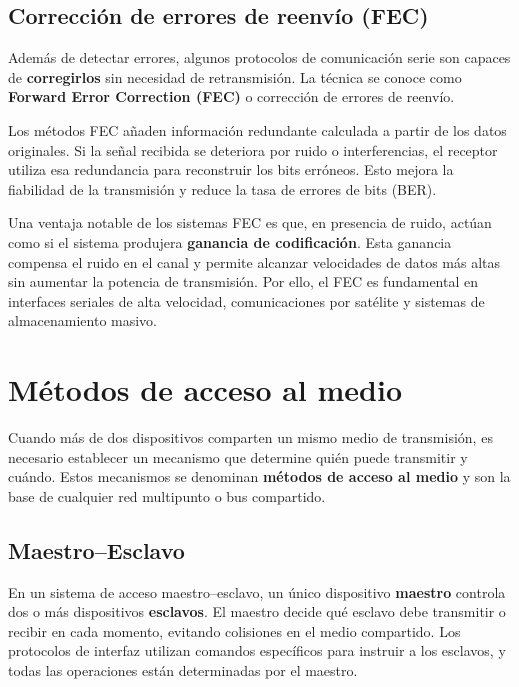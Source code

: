 \subsection{Corrección de errores de reenvío (FEC)}

Además de detectar errores, algunos protocolos de comunicación serie son capaces de \textbf{corregirlos} sin necesidad de retransmisión. La técnica se conoce como \textbf{Forward Error Correction (FEC)} o corrección de errores de reenvío.

Los métodos FEC añaden información redundante calculada a partir de los datos originales. Si la señal recibida se deteriora por ruido o interferencias, el receptor utiliza esa redundancia para reconstruir los bits erróneos. Esto mejora la fiabilidad de la transmisión y reduce la tasa de errores de bits (BER).

Una ventaja notable de los sistemas FEC es que, en presencia de ruido, actúan como si el sistema produjera \textbf{ganancia de codificación}. Esta ganancia compensa el ruido en el canal y permite alcanzar velocidades de datos más altas sin aumentar la potencia de transmisión. Por ello, el FEC es fundamental en interfaces seriales de alta velocidad, comunicaciones por satélite y sistemas de almacenamiento masivo.




\section{Métodos de acceso al medio}

Cuando más de dos dispositivos comparten un mismo medio de transmisión, es necesario establecer un mecanismo que determine quién puede transmitir y cuándo. Estos mecanismos se denominan \textbf{métodos de acceso al medio} y son la base de cualquier red multipunto o bus compartido.

\subsection{Maestro--Esclavo}

En un sistema de acceso maestro--esclavo, un único dispositivo \textbf{maestro} controla dos o más dispositivos \textbf{esclavos}. El maestro decide qué esclavo debe transmitir o recibir en cada momento, evitando colisiones en el medio compartido. Los protocolos de interfaz utilizan comandos específicos para instruir a los esclavos, y todas las operaciones están determinadas por el maestro.

